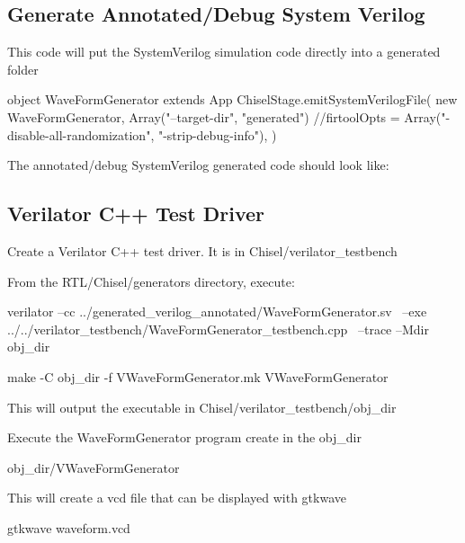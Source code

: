 \subsection{Generate Annotated/Debug System Verilog}
This code will put the SystemVerilog simulation code directly into a generated folder
\begin{chiselcode}
object WaveFormGenerator extends App {
  ChiselStage.emitSystemVerilogFile(
    new WaveFormGenerator,
    Array("--target-dir", "generated")
    //firtoolOpts = Array("-disable-all-randomization", "-strip-debug-info"),
  )
}
\end{chiselcode}

The annotated/debug SystemVerilog generated code should look like:

\subsection{Verilator C++ Test Driver} \label{sub:verilator_test_driver}
Create a Verilator C++ test driver. It is in Chisel/verilator\_testbench

From the RTL/Chisel/generators directory, execute:
\begin{bashcode}
verilator --cc ../generated_verilog_annotated/WaveFormGenerator.sv \
  --exe ../../verilator_testbench/WaveFormGenerator_testbench.cpp \
  --trace --Mdir obj_dir

make -C obj_dir -f VWaveFormGenerator.mk VWaveFormGenerator
\end{bashcode}

This will output the executable in Chisel/verilator\_testbench/obj\_dir

Execute the WaveFormGenerator program create in the obj\_dir
\begin{bashcode}
obj_dir/VWaveFormGenerator
\end{bashcode}

This will create a vcd file that can be displayed with gtkwave
\begin{bashcode}
gtkwave waveform.vcd    
\end{bashcode}

